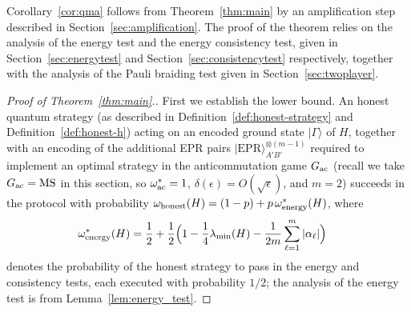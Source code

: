 \documentclass[11pt,letterpaper]{article}
\newcommand{\<}{\langle}
\renewcommand{\>}{\rangle}
\newcommand{\ket}[1]{| #1 \>}
\newcommand{\eps}{\epsilon}
\newcommand{\wg}{\omega^*_{\ensuremath{\rm ac}}}
\newcommand{\energy}{\ensuremath{\rm energy}}
\newcommand{\ac}{{\ensuremath{\rm ac}}}
\newcommand{\EPR}{\mathrm{EPR}}
\newcommand{\MS}{\mathrm{MS}}
\begin{document}
Corollary~\ref{cor:qma} follows from Theorem~\ref{thm:main} by an amplification step described in Section~\ref{sec:amplification}. The proof of the theorem relies on the analysis of the energy test and the energy consistency test, given in Section~\ref{sec:energytest} and Section~\ref{sec:consistencytest} respectively, together with the analysis of the Pauli braiding test given in Section~\ref{sec:twoplayer}. 

\begin{proof}[Proof of Theorem~\ref{thm:main}.]
  First we establish the lower bound. 
  An honest quantum strategy (as described in Definition~\ref{def:honest-strategy} and Definition~\ref{def:honest-h}) acting on an encoded ground state $\ket{\Gamma}$ of $H$, together with an encoding of the additional EPR pairs $\ket{\EPR}^{\otimes (m-1)}_{A'B'}$ required to implement an optimal strategy in the anticommutation game $G_\ac$ (recall we take $G_\ac=\MS$ in this section, so $\wg=1$, $\delta(\eps)=O(\sqrt{\eps})$, and $m=2$) succeeds in the protocol with probability
$ \omega_{\rm honest}(H) = (1-p) + p\, \omega^*_{\energy}(H)$,
where
\begin{align*}
 \omega^*_{\energy}(H) &=\frac{1}{2} + \frac{1}{2}\Big( 1 -
    \frac{1}{4} \lambda_{\min}(H)  - \frac{1}{2m} \sum_{\ell=1}^m |\alpha_{\ell}| \Big)
\end{align*}
denotes the probability of the honest strategy to pass in the energy and consistency tests, each executed with probability $1/2$; the analysis of the energy test is from Lemma~\ref{lem:energy_test}.


\end{proof}
\end{document}

